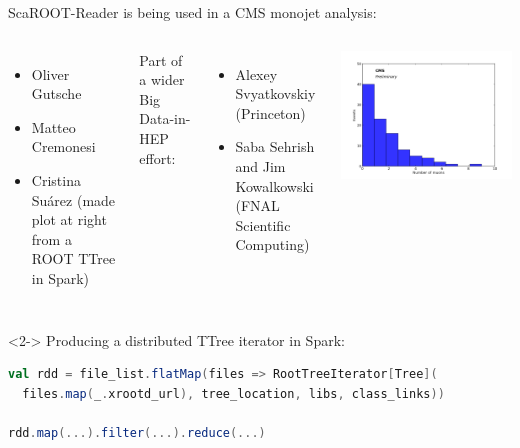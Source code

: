 \documentclass{beamer}
\begin{document}
\begin{frame}[fragile]{}
\hspace{-0.6 cm}ScaROOT-Reader is being used in a CMS monojet analysis:
\begin{columns}
\begin{itemize}
\item Oliver Gutsche
\item Matteo Cremonesi
\item Cristina Su\'arez (made plot at right from a ROOT TTree in Spark)
\end{itemize}

\vspace{0.5 cm}
Part of a wider Big Data-in-HEP effort:
\begin{itemize}
\item Alexey Svyatkovskiy (Princeton)
\item Saba Sehrish and Jim Kowalkowski (FNAL Scientific Computing)
\end{itemize}
\includegraphics[width=\linewidth]{THE_PLOT.png}
\end{columns}

\vspace{0.5 cm}
\begin{uncoverenv}<2->
\hspace{-0.6 cm}Producing a distributed TTree iterator in Spark:

\begin{lstlisting}[language=scala]
val rdd = file_list.flatMap(files => RootTreeIterator[Tree](
  files.map(_.xrootd_url), tree_location, libs, class_links))

rdd.map(...).filter(...).reduce(...)
\end{lstlisting}
\end{uncoverenv}
\end{frame}
\end{document}
